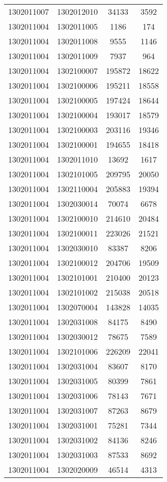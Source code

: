 \begin{longtable}{llcc}
1302011007 & 1302012010 & 34133 & 3592\\
1302011004 & 1302011005 & 1186 & 174\\
1302011004 & 1302011008 & 9555 & 1146\\
1302011004 & 1302011009 & 7937 & 964\\
1302011004 & 1302100007 & 195872 & 18622\\
1302011004 & 1302100006 & 195211 & 18558\\
1302011004 & 1302100005 & 197424 & 18644\\
1302011004 & 1302100004 & 193017 & 18579\\
1302011004 & 1302100003 & 203116 & 19346\\
1302011004 & 1302100001 & 194655 & 18418\\
1302011004 & 1302011010 & 13692 & 1617\\
1302011004 & 1302101005 & 209795 & 20050\\
1302011004 & 1302110004 & 205883 & 19394\\
1302011004 & 1302030014 & 70074 & 6678\\
1302011004 & 1302100010 & 214610 & 20484\\
1302011004 & 1302100011 & 223026 & 21521\\
1302011004 & 1302030010 & 83387 & 8206\\
1302011004 & 1302100012 & 204706 & 19509\\
1302011004 & 1302101001 & 210400 & 20123\\
1302011004 & 1302101002 & 215038 & 20518\\
1302011004 & 1302070004 & 143828 & 14035\\
1302011004 & 1302031008 & 84175 & 8490\\
1302011004 & 1302030012 & 78675 & 7589\\
1302011004 & 1302101006 & 226209 & 22041\\
1302011004 & 1302031004 & 83607 & 8170\\
1302011004 & 1302031005 & 80399 & 7861\\
1302011004 & 1302031006 & 78143 & 7671\\
1302011004 & 1302031007 & 87263 & 8679\\
1302011004 & 1302031001 & 75281 & 7344\\
1302011004 & 1302031002 & 84136 & 8246\\
1302011004 & 1302031003 & 87533 & 8692\\
1302011004 & 1302020009 & 46514 & 4313\\

\end{longtable}
